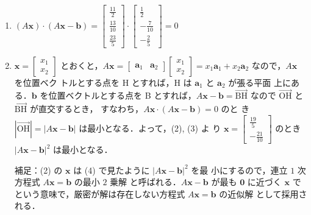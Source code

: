 \documentclass[11pt, uplatex, dvipdfmx]{jsarticle}
\renewcommand*{\vec}[1]{\overrightarrow{\textrm{#1}}}
\begin{document}
\begin{enumerate}
\begin{enumerate}[(1)]
    
  \item $(A\bm{x}) \cdot (A\bm{x}-\bm{b}) = \left[
      \begin{array}{r}
        \frac{11}{2}\\
        \frac{13}{10}\\
        \frac{23}{5}
      \end{array}
    \right] \cdot \left[
      \begin{array}{r}
        \frac{1}{2}\\
        -\frac{7}{10}\\
        -\frac{2}{5}
      \end{array}
    \right]=0$
    
  \item $\bm{x}=\left[
      \begin{array}{c}
        x_1\\
        x_2
      \end{array}
    \right]$ とおくと，$A\bm{x} = \left[
      \begin{array}{cc}
        \bm{a}_1 & \bm{a}_2
      \end{array}
    \right] \left[
      \begin{array}{c}
        x_1\\
        x_2
      \end{array}
    \right] = x_1 \bm{a}_1 + x_2 \bm{a}_2$ なので，$A\bm{x}$ を位置ベク
    トルとする点を H とすれば，H は $\bm{a}_1$ と $\bm{a}_2$ が張る平面
    上にある．$\bm{b}$ を位置ベクトルとする点を B とすれば，$A\bm{x} -
    \bm{b} = \vec{BH}$ なので $\vec{OH}$ と $\vec{BH}$ が直交するとき，
    すなわち，$A\bm{x} \cdot (A\bm{x}-\bm{b})=0$ のと
    き $|\vec{OH}|=|A\bm{x}-\bm{b}|$ は最小となる．よって，(2), (3) よ
    り $\bm{x}=\left[
      \begin{array}{r}
        \frac{19}{5}\\
        -\frac{21}{10}
      \end{array}
    \right]$ のとき $|A\bm{x}-\bm{b}|^2$ は最小となる．

    \vspace{1zh}

    補足：(2) の $\bm{x}$ は (4) で見たように $|A\bm{x}-\bm{b}|^2$ を最
    小にするので，連立 $1$ 次方程式 $A\bm{x} = \bm{b}$ の最小 $2$ 乗解
    と呼ばれる．$A\bm{x} - \bm{b}$ が最も $\bm{0}$ に近づく $\bm{x}$ で
    という意味で，厳密が解は存在しない方程式 $A\bm{x}=\bm{b}$ の近似解
    として採用される．
  \end{enumerate}

\end{enumerate}
\end{document}
